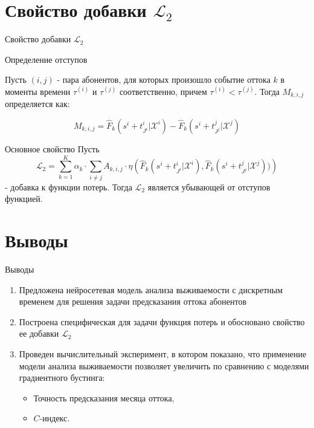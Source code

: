 \documentclass[10pt,pdf,hyperref={unicode}]{beamer}
\begin{document}
\section{Свойство добавки $\mathcal{L}_2$}
\begin{frame}{Свойство добавки $\mathcal{L}_2$}
	
\begin{block}{Определение отступов}
	
		Пусть $(i,j)$ - пара абонентов, для которых произошло событие оттока $k$ в моменты времени $\tau^{(i)}$ и $\tau^{(j)}$ соответственно, причем $\tau^{(i)} < \tau^{(j)}$. Тогда $M_{k,i,j}$ определяется как:
		
		$$M_{k,i,j} = \hat{F}_k(s^i+t_{J^i}^i|\mathcal{X}^i) - \hat{F}_k(s^i+t_{J^j}^j|\mathcal{X}^j)$$
		
\end{block}


\begin{block}{Основное свойство}
	Пусть $$\mathcal{L}_2 =\sum_{k=1}^K\alpha_k\cdot\sum_{i\neq j}A_{k,i,j}\cdot\eta\left(\hat{F}_k(s^i+t_{J^i}^i|\mathcal{X}^i) , \hat{F}_k(s^i+t_{J^j}^j|\mathcal{X}^j))\right)$$- добавка к функции потерь. Тогда $\mathcal{L}_2$ является убывающей от отступов функцией.  
\end{block}

\end{frame}

\section{Выводы}
\begin{frame}{Выводы}
	\justifying
	\begin{minipage}{0.85\textwidth} %
		\begin{enumerate}
			\justifying
			\item Предложена нейросетевая модель анализа выживаемости с дискретным временем для решения задачи предсказания оттока абонентов
			
			\item Построена специфическая для задачи функция потерь и обосновано свойство ее добавки $\mathcal{L}_2$
			
			\item Проведен вычислительный эксперимент, в котором показано, что применение модели анализа выживаемости позволяет увеличить по сравнению с моделями градиентного бустинга: 
			\begin{itemize}
				\item Точность предсказания месяца оттока,
				\item $C$-индекс.
			\end{itemize}
		\end{enumerate}
	\end{minipage}
\end{frame}

\end{document}
